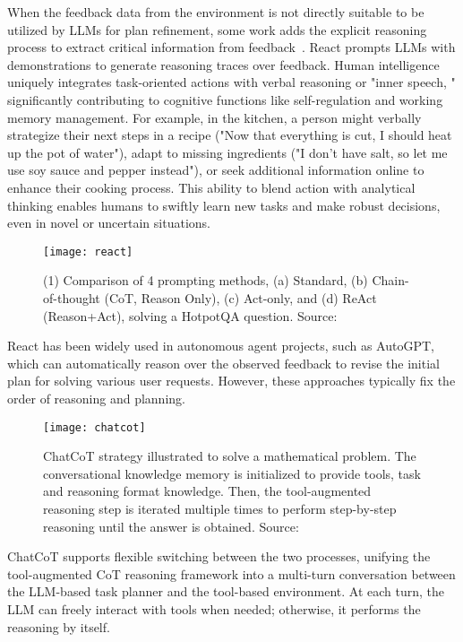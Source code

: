 When the feedback data from the environment is not directly suitable to be utilized by LLMs for plan refinement, some work adds the explicit reasoning process to extract critical information from feedback~\cite{chen2023chatcot, yao2022react}.
React prompts LLMs with demonstrations to generate reasoning traces over feedback.
Human intelligence uniquely integrates task-oriented actions with verbal reasoning or "inner speech, " significantly contributing to cognitive functions like self-regulation and working memory management.
For example, in the kitchen, a person might verbally strategize their next steps in a recipe ("Now that everything is cut, I should heat up the pot of water"), adapt to missing ingredients ("I don’t have salt, so let me use soy sauce and pepper instead"), or seek additional information online to enhance their cooking process.
This ability to blend action with analytical thinking enables humans to swiftly learn new tasks and make robust decisions, even in novel or uncertain situations.
\begin{figure}[h!]
	\centering
	\texttt{[image: react]}
	\caption{(1) Comparison of 4 prompting methods, (a) Standard, (b) Chain-of-thought (CoT, Reason Only), (c) Act-only, and (d) ReAct (Reason+Act), solving a HotpotQA \cite{yang2018hotpotqa} question. Source: \textcite{chen2023chatcot}}
	\label{fig:react}
\end{figure}
React has been widely used in autonomous agent projects, such as AutoGPT, which can automatically reason over the observed feedback to revise the initial plan for solving various user requests.
However, these approaches typically fix the order of reasoning and planning.
\begin{figure}[h!]
	\centering
	\texttt{[image: chatcot]}
	\caption{ChatCoT strategy illustrated to solve a mathematical problem. The conversational knowledge memory is initialized to provide tools, task and reasoning format knowledge. Then, the tool-augmented reasoning step is iterated multiple times to perform step-by-step reasoning until the answer is obtained. Source: \textcite{chen2023chatcot}}
	\label{fig:chatcot}
\end{figure}

ChatCoT supports flexible switching between the two processes, unifying the tool-augmented CoT reasoning framework into a multi-turn conversation between the LLM-based task planner and the tool-based environment.
At each turn, the LLM can freely interact with tools when needed; otherwise, it performs the reasoning by itself.

